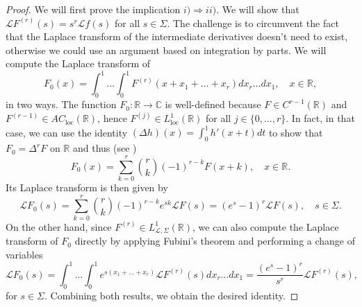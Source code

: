 \documentclass[a4paper,12pt,oneside]{article}
\theoremstyle{definition}
\newcommand{\C}{\mathbb{C}}
\newcommand{\R}{\mathbb{R}}
\newcommand{\im}{\Rightarrow}
\newcommand{\LT}[1]{\mathcal{L}#1}
\begin{document}
\begin{proof}
    We will first prove the implication $i)\im ii)$. We will show that $\LT{F^{(r)}}(s)=s^r\LT{f}(s)$ for all $s\in\Sigma$. The challenge is to circumvent the fact that the Laplace transform of the intermediate derivatives doesn't need to exist, otherwise we could use an argument based on integration by parts. We will compute the Laplace transform of
        $$ F_0(x) = \int_0^1 \dots \int_0^1 F^{(r)}(x+x_1+\dots+x_r) dx_r\dots dx_1,\quad x\in\R,  $$
    in two ways. The function $F_0:\R\to\C$ is well-defined because $F\in C^{r-1}(\R)$ and $F^{(r-1)}\in AC_{\text{loc}}(\R)$, hence $F^{(j)}\in L^1_{\text{loc}}(\R)$ for all $j\in\{0,\dots,r\}$. In fact, in that case, we can use the identity $(\Delta h)(x) = \int_0^1 h'(x+t) dt $ to show that $F_0 = \Delta^r F$ on $\R$ and thus (see \cite[Eq. 3.9.4]{DLMF})
        $$ F_0(x) = \sum_{k=0}^{r} \binom{r}{k} (-1)^{r-k} F(x+k),\quad x\in\R. $$
    Its Laplace transform is then given by
        $$ \LT{F_0}(s) = \sum_{k=0}^{r} \binom{r}{k} (-1)^{r-k} e^{sk} \LT{F}(s) = (e^s-1)^r \LT{F}(s),\quad s\in\Sigma. $$
    On the other hand, since $F^{(r)}\in L_{\LT{},\Sigma}^{1}(\R)$, we can also compute the Laplace transform of $F_0$ directly by applying Fubini's theorem and performing a change of variables
        $$ \LT{F_0}(s) = \int_0^1 \dots \int_0^1  e^{s(x_1+\dots+x_r)} \LT{F^{(r)}}(s) dx_r\dots dx_1 =  \frac{(e^s-1)^r}{s^r} \LT{F^{(r)}}(s),$$
    for $s\in\Sigma$. Combining both results, we obtain the desired identity.
    \medbreak
    

\end{proof}
\end{document}
